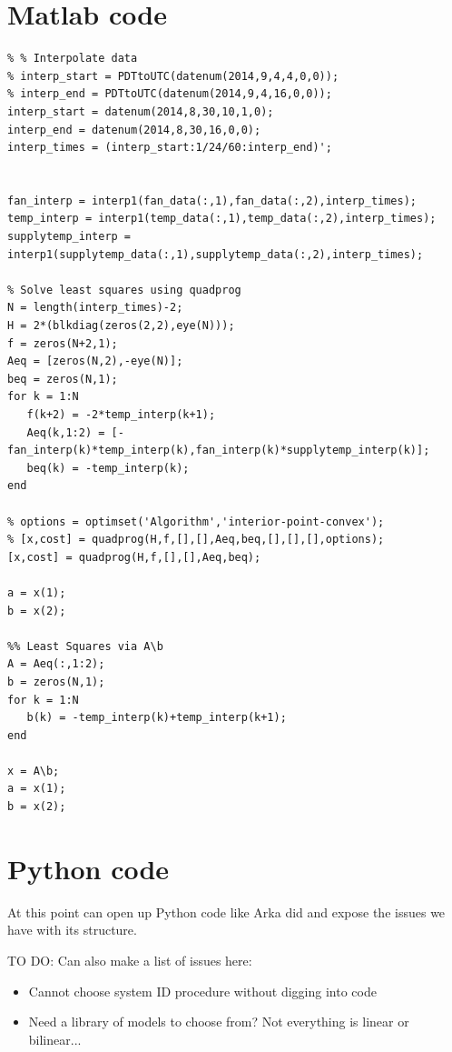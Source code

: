 \documentclass{article}
\begin{document}
\section{Matlab code}
\begin{verbatim}
% % Interpolate data
% interp_start = PDTtoUTC(datenum(2014,9,4,4,0,0));
% interp_end = PDTtoUTC(datenum(2014,9,4,16,0,0));
interp_start = datenum(2014,8,30,10,1,0);
interp_end = datenum(2014,8,30,16,0,0);
interp_times = (interp_start:1/24/60:interp_end)';


fan_interp = interp1(fan_data(:,1),fan_data(:,2),interp_times);
temp_interp = interp1(temp_data(:,1),temp_data(:,2),interp_times);
supplytemp_interp = interp1(supplytemp_data(:,1),supplytemp_data(:,2),interp_times);

% Solve least squares using quadprog
N = length(interp_times)-2;
H = 2*(blkdiag(zeros(2,2),eye(N)));
f = zeros(N+2,1);
Aeq = [zeros(N,2),-eye(N)];
beq = zeros(N,1);
for k = 1:N
   f(k+2) = -2*temp_interp(k+1);
   Aeq(k,1:2) = [-fan_interp(k)*temp_interp(k),fan_interp(k)*supplytemp_interp(k)];
   beq(k) = -temp_interp(k);
end

% options = optimset('Algorithm','interior-point-convex');
% [x,cost] = quadprog(H,f,[],[],Aeq,beq,[],[],[],options);
[x,cost] = quadprog(H,f,[],[],Aeq,beq);

a = x(1);
b = x(2);

%% Least Squares via A\b
A = Aeq(:,1:2);
b = zeros(N,1);
for k = 1:N
   b(k) = -temp_interp(k)+temp_interp(k+1);
end

x = A\b;
a = x(1);
b = x(2);

\end{verbatim}

\section{Python code}
At this point can open up Python code like Arka did and expose the issues we have with its structure.

TO DO: Can also make a list of issues here:
\begin{itemize}
\item Cannot choose system ID procedure without digging into code
\item Need a library of models to choose from? Not everything is linear or bilinear...
\end{itemize}
\end{document}

